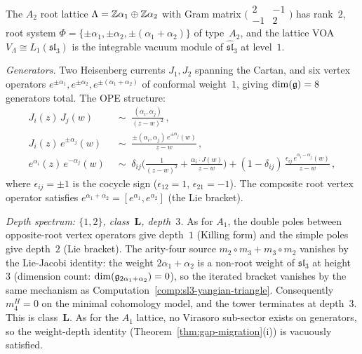 \begin{computation}%
\label{comp:lattice-voa-A2-ordered-bar}%
%
%
%
The $A_2$ root lattice $\Lambda = \mathbb{Z}\alpha_1 \oplus \mathbb{Z}\alpha_2$
with Gram matrix
$\bigl(\begin{smallmatrix} 2 & -1 \\ -1 & 2
\end{smallmatrix}\bigr)$
has rank~$2$, root system $\Phi = \{\pm\alpha_1, \pm\alpha_2,
\pm(\alpha_1+\alpha_2)\}$ of type~$A_2$, and the lattice VOA
$V_\Lambda \cong L_1(\mathfrak{sl}_3)$ is the integrable vacuum
module of $\widehat{\mathfrak{sl}}_3$ at level~$1$.

\smallskip
\noindent
\emph{Generators.}
Two Heisenberg currents $J_1, J_2$ spanning the Cartan,
and six vertex operators $e^{\pm\alpha_1}, e^{\pm\alpha_2},
e^{\pm(\alpha_1+\alpha_2)}$ of conformal weight~$1$,
giving $\dim(\mathfrak{g}) = 8$ generators total.
The OPE structure:
\begin{align}
J_i(z)\,J_j(w) &\;\sim\; \frac{(\alpha_i,\alpha_j)}{(z-w)^2}\,,
\label{eq:A2-cartan-ope}
\\[3pt]
J_i(z)\,e^{\pm\alpha_j}(w) &\;\sim\;
\frac{\pm(\alpha_i,\alpha_j)\,e^{\pm\alpha_j}(w)}{z-w}\,,
\\[3pt]
e^{\alpha_i}(z)\,e^{-\alpha_j}(w)
&\;\sim\;
\delta_{ij}\biggl(
\frac{1}{(z-w)^2}
+ \frac{\alpha_i \cdot J(w)}{z-w}\biggr)
+ (1-\delta_{ij})\,
\frac{\epsilon_{ij}\,e^{\alpha_i-\alpha_j}(w)}{z-w}\,,
\label{eq:A2-vertex-ope}
\end{align}
where $\epsilon_{ij} = \pm 1$ is the cocycle sign
($\epsilon_{12} = 1$, $\epsilon_{21} = -1$). The composite
root vertex operator satisfies
$e^{\alpha_1+\alpha_2} = [e^{\alpha_1}, e^{\alpha_2}]$
(the Lie bracket).

\smallskip
\noindent
\emph{Depth spectrum: $\{1,2\}$, class~$\mathbf{L}$, depth~$3$.}
As for $A_1$, the double poles between opposite-root vertex
operators give depth~$1$ (Killing form) and the simple poles
give depth~$2$ (Lie bracket). The arity-four source
\(m_2\circ m_3+m_3\circ m_2\) vanishes by the Lie-Jacobi identity:
the weight $2\alpha_1 + \alpha_2$ is a non-root weight of
$\mathfrak{sl}_3$ at height~$3$ (dimension count: $\dim(\mathfrak{g}_{2\alpha_1+\alpha_2}) = 0$),
so the iterated bracket vanishes by the same mechanism as
Computation~\ref{comp:sl3-yangian-triangle}.
Consequently \(m_4^H=0\) on the minimal cohomology model, and the
tower terminates at depth~$3$. This is class~$\mathbf{L}$.
As for the $A_1$ lattice, no Virasoro sub-sector exists on generators, so the weight-depth identity (Theorem~\ref{thm:gap-migration}(i)) is vacuously satisfied.


\end{computation}

